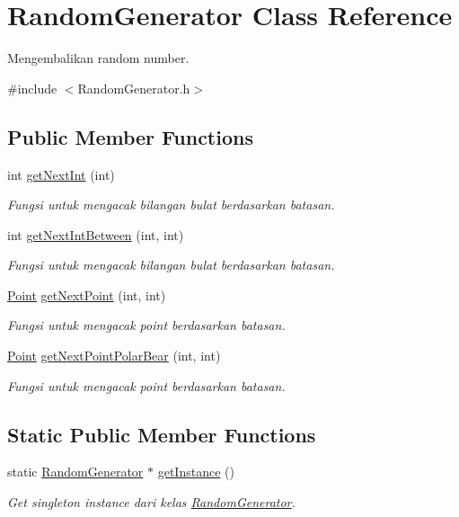\hypertarget{class_random_generator}{}\section{Random\+Generator Class Reference}
\label{class_random_generator}


Mengembalikan random number.  




{\ttfamily \#include $<$Random\+Generator.\+h$>$}

\subsection*{Public Member Functions}
\begin{DoxyCompactItemize}
\item 
int \hyperlink{class_random_generator_a7bdfd5b421ffaa1de622804fee51c3eb}{get\+Next\+Int} (int)
\begin{DoxyCompactList}\small\item\em Fungsi untuk mengacak bilangan bulat berdasarkan batasan. \end{DoxyCompactList}\item 
int \hyperlink{class_random_generator_ab230d076577cb8a5719b866ad2d23460}{get\+Next\+Int\+Between} (int, int)
\begin{DoxyCompactList}\small\item\em Fungsi untuk mengacak bilangan bulat berdasarkan batasan. \end{DoxyCompactList}\item 
\hyperlink{class_point}{Point} \hyperlink{class_random_generator_a4c6407b76023eed6f10e58996c0fdcae}{get\+Next\+Point} (int, int)
\begin{DoxyCompactList}\small\item\em Fungsi untuk mengacak point berdasarkan batasan. \end{DoxyCompactList}\item 
\hyperlink{class_point}{Point} \hyperlink{class_random_generator_aeafbf3bcd982430565118fdfba34ddec}{get\+Next\+Point\+Polar\+Bear} (int, int)
\begin{DoxyCompactList}\small\item\em Fungsi untuk mengacak point berdasarkan batasan. \end{DoxyCompactList}\end{DoxyCompactItemize}
\subsection*{Static Public Member Functions}
\begin{DoxyCompactItemize}
\item 
static \hyperlink{class_random_generator}{Random\+Generator} $\ast$ \hyperlink{class_random_generator_abc2ce3ecccf8a36af2ab362effd7e5a1}{get\+Instance} ()
\begin{DoxyCompactList}\small\item\em Get singleton instance dari kelas \hyperlink{class_random_generator}{Random\+Generator}. \end{DoxyCompactList}\end{DoxyCompactItemize}


